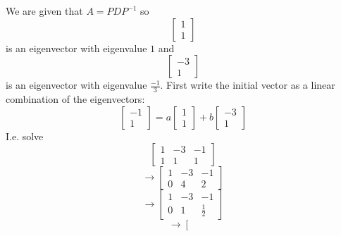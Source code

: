 \documentclass{article}
\begin{document}
\begin{Answer}
  We are given that $A = PDP^{-1}$ so 
  \begin{equation*}
  \left[
  \begin{array}{c}
  1\\
  1
  \end{array}
  \right]
  \end{equation*} is an eigenvector with eigenvalue $1$ and 
  \begin{equation*}
  \left[
  \begin{array}{c}
  -3\\
  1
  \end{array}
  \right]
  \end{equation*} is an eigenvector with eigenvalue $\frac{-1}{3}$.
  First write the initial vector as a linear combination of the eigenvectors:
  \begin{equation*}
  \left[
  \begin{array}{c}
  -1\\
  1
  \end{array}
  \right] = a \left[
  \begin{array}{c}
  1\\
  1
  \end{array}
  \right]+b \left[
  \begin{array}{c}
  -3\\
  1
  \end{array}
  \right]
  \end{equation*}
  I.e. solve 
  \begin{equation*}
  \left[
  \begin{array}{cc|c}
  1&-3&-1\\
  1&1&1
  \end{array}
  \right]
  \end{equation*}
  \begin{equation*}
  \rightarrow\left[
  \begin{array}{cc|c}
  1&-3&-1\\
  0&4&2
  \end{array}
  \right]
  \end{equation*}
  \begin{equation*}
  \rightarrow\left[
  \begin{array}{cc|c}
  1&-3&-1\\
  0&1&\frac{1}{2}
  \end{array}
  \right]
  \end{equation*}
  \begin{equation*}
  \rightarrow\left[
  \begin{array}{cc|c}

\end{array}
\end{equation*}
\end{Answer}
\end{document}
